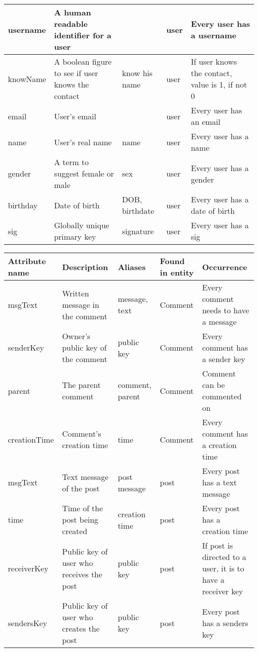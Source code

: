 \begin{landscape}
\begin{tabular}{| p{2cm} | p{4cm} | p{3cm} | p{3cm} | p{6cm} |}
    username     & A human readable identifier for a user             & 	           & user   & Every user has a username \\ \hline
    knowName     & A boolean figure to see if user knows the contact  & know his name  & user   & If user knows the contact, value is 1, if not 0  \\ \hline
    email        & User's email	                                      &                & user   & Every user has an email \\ \hline
    name         & User's real name						              & name           & user   & Every user has a name \\ \hline
    gender       & A term to suggest female or male                   & sex            & user   & Every user has a gender\\ \hline
    birthday     & Date of birth 							          & DOB, birthdate & user   & Every user has a date of birth \\ \hline
    sig          & Globally unique primary key & signature & user & Every user has a sig \\ \hline
    \hline 
    \end{tabular}
    
        \begin{tabular}{| p{2cm} | p{4cm} | p{3cm} | p{3cm} | p{6cm} |}
    \hline
    Attribute name         & Description                             & Aliases             & Found in entity            & Occurrence          \\ \hline
    msgText 	 & Written message in the comment      & message, text      & Comment    & Every comment needs to have a message \\ \hline
    senderKey  	 & Owner's public key of the comment   & public key         & Comment    & Every comment has a sender key \\ \hline
    parent		 & The parent comment                  & comment, parent    & Comment    & Comment can be commented on \\ \hline
    creationTime & Comment's creation time             & time               & Comment    & Every comment has a creation time \\ \hline

    msgText	     & Text message of the post                 & post message  & post & Every post has a text message \\ \hline
    time         & Time of the post being created           & creation time & post & Every post has a creation time \\ \hline
    receiverKey  & Public key of user who receives the post & public key    & post & If post is directed to a user, it is to have a receiver key \\ \hline
    sendersKey   & Public key of user who creates the post  & public key    & post & Every post has a senders key \\ \hline
    

\end{tabular}
\end{landscape}
